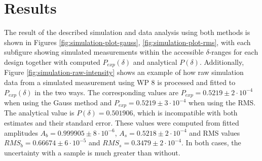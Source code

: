 \section{Results}
The result of the described simulation and data analysis using both methods is shown in Figures \ref{fig:simulation-plot-gauss}, \ref{fig:simulation-plot-rms}, with each subfigure showing simulated measurements within the accessible $\delta$-ranges for each design together with computed $P_{exp}(\delta)$ and analytical $P(\delta)$. Additionally, Figure \ref{fig:simulation-raw-intensity} shows an example of how raw simulation data from a simulated measurement using WP 8 is processed and fitted to $P_{exp}(\delta)$ in the two ways. The corresponding values are $P_{exp} = 0.5219 \pm 2 \cdot 10^{-4}$ when using the Gauss method and $P_{exp} = 0.5219 \pm 3 \cdot 10^{-4}$ when using the RMS. The analytical value is $P(\delta) = 0.501906$, which is incompatible with both estimates and their standard error. These values were computed from fitted amplitudes $A_b = 0.999905 \pm 8\cdot 10^{-6}$, $A_s = 0.5218 \pm 2 \cdot 10^{-4}$ and RMS values $RMS_b = 0.66674 \pm 6\cdot 10^{-5}$ and $RMS_s = 0.3479 \pm 2 \cdot 10^{-4}$. In both cases, the uncertainty with a sample is much greater than without.
